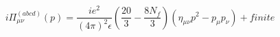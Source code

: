 \begin{equation}
i\Pi_{\mu\nu}^{(abcd)}(p)=\frac{ie^{2}}{(4\pi)^{2}\epsilon}\left(\frac{20}{3}
-\frac{8N_{f}}{3}\right)\left(\eta_{\mu\nu}p^{2}-p_{\mu}p_{\nu}\right)+finite
\end{equation}

